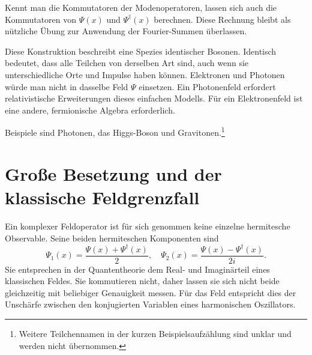 Kennt man die Kommutatoren der Modenoperatoren, lassen sich auch die Kommutatoren von \(\Psi(x)\) und \(\Psi^\dagger(x)\) berechnen. Diese Rechnung bleibt als nützliche Übung zur Anwendung der Fourier-Summen überlassen.

Diese Konstruktion beschreibt eine Spezies identischer Bosonen. Identisch bedeutet, dass alle Teilchen von derselben Art sind, auch wenn sie unterschiedliche Orte und Impulse haben können. Elektronen und Photonen würde man nicht in dasselbe Feld \(\Psi\) einsetzen. Ein Photonenfeld erfordert relativistische Erweiterungen dieses einfachen Modells. Für ein Elektronenfeld ist eine andere, fermionische Algebra erforderlich.

\begin{classroomqa}
\end{classroomqa}


Beispiele sind Photonen, das Higgs-Boson und Gravitonen.\footnote{Weitere Teilchennamen in der kurzen Beispielsaufzählung sind unklar und werden nicht übernommen.}

\section{Große Besetzung und der klassische Feldgrenzfall}

Ein komplexer Feldoperator ist für sich genommen keine einzelne hermitesche Observable. Seine beiden hermiteschen Komponenten sind
\begin{equation}
\Psi_1(x)=\frac{\Psi(x)+\Psi^\dagger(x)}{2},
\quad
\Psi_2(x)=\frac{\Psi(x)-\Psi^\dagger(x)}{2i}.
\end{equation}
Sie entsprechen in der Quantentheorie dem Real- und Imaginärteil eines klassischen Feldes. Sie kommutieren nicht, daher lassen sie sich nicht beide gleichzeitig mit beliebiger Genauigkeit messen. Für das Feld entspricht dies der Unschärfe zwischen den konjugierten Variablen eines harmonischen Oszillators.

